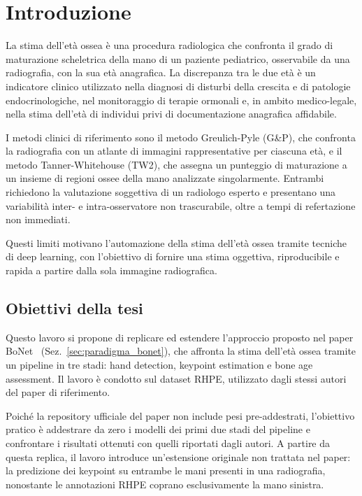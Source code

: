 \chapter*{Introduzione}

La stima dell'età ossea è una procedura radiologica che confronta il
grado di maturazione scheletrica della mano di un paziente pediatrico,
osservabile da una radiografia, con la sua età anagrafica. La
discrepanza tra le due età è un indicatore clinico utilizzato nella
diagnosi di disturbi della crescita e di patologie endocrinologiche,
nel monitoraggio di terapie ormonali e, in ambito medico-legale, nella
stima dell'età di individui privi di documentazione anagrafica
affidabile.

I metodi clinici di riferimento sono il metodo Greulich-Pyle (G\&P), che
confronta la radiografia con un atlante di immagini rappresentative per
ciascuna età, e il metodo Tanner-Whitehouse (TW2), che assegna un
punteggio di maturazione a un insieme di regioni ossee della mano
analizzate singolarmente. Entrambi
richiedono la valutazione soggettiva di un radiologo esperto e
presentano una variabilità inter- e intra-osservatore non trascurabile,
oltre a tempi di refertazione non immediati.

Questi limiti motivano l'automazione della stima dell'età ossea tramite
tecniche di deep learning, con l'obiettivo di fornire una stima
oggettiva, riproducibile e rapida a partire dalla sola immagine
radiografica.

\section*{Obiettivi della tesi}

Questo lavoro si propone di replicare ed estendere l'approccio proposto
nel paper BoNet~\cite{escobar2019bonet} (Sez.~\ref{sec:paradigma_bonet}),
che affronta la stima dell'età ossea tramite un pipeline in tre stadi:
hand detection, keypoint estimation e bone age assessment. Il lavoro è
condotto sul dataset RHPE, utilizzato dagli stessi autori del paper di
riferimento.

Poiché la repository ufficiale del paper non include pesi
pre-addestrati, l'obiettivo pratico è addestrare da zero i modelli dei
primi due stadi del pipeline e confrontare i risultati ottenuti con
quelli riportati dagli autori. A partire da questa replica, il lavoro
introduce un'estensione originale non trattata nel paper: la predizione
dei keypoint su entrambe le mani presenti in una radiografia,
nonostante le annotazioni RHPE coprano esclusivamente la mano sinistra.

